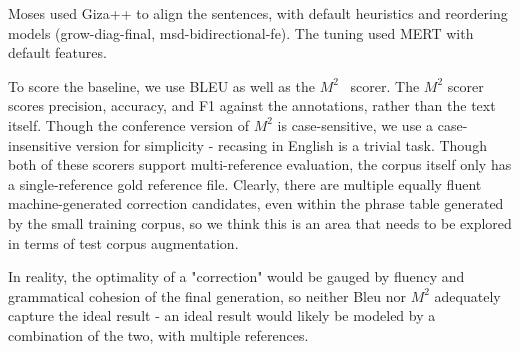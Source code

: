 \documentclass[11pt,letterpaper]{article}
\begin{document}
Moses used Giza++ to align the sentences, with default heuristics and reordering models (grow-diag-final, msd-bidirectional-fe). The tuning used MERT with default features. 

To score the baseline, we use BLEU as well as the $M^2$~\cite{M2} scorer. The $M^2$ scorer scores precision, accuracy, and F1 against the annotations, rather than the text itself. Though the conference version of $M^2$ is case-sensitive, we use a case-insensitive version for simplicity - recasing in English is a trivial task. Though both of these scorers support multi-reference evaluation, the corpus itself only has a single-reference gold reference file. Clearly, there are multiple equally fluent machine-generated correction candidates, even within the phrase table generated by the small training corpus, so we think this is an area that needs to be explored in terms of test corpus augmentation.

In reality, the optimality of a "correction" would be gauged by fluency and grammatical cohesion of the final generation, so neither Bleu nor $M^2$ adequately capture the ideal result - an ideal result would likely be modeled by a combination of the two, with multiple references. 
\end{document}
